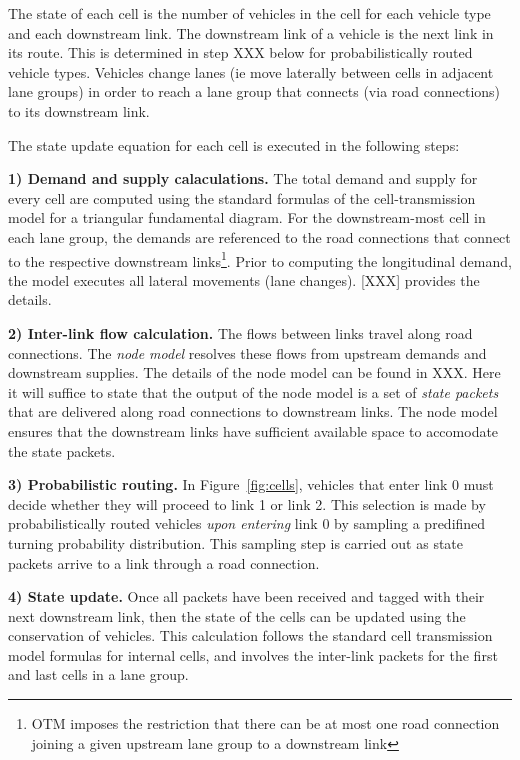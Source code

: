 The state of each cell is the number of vehicles in the cell for each vehicle type and each downstream link. The downstream link of a vehicle is the next link in its route. This is determined in step XXX below for probabilistically routed vehicle types. Vehicles change lanes (ie move laterally between cells in adjacent lane groups) in order to reach a lane group that connects (via road connections) to its downstream link. 

The state update equation for each cell is executed in the following steps:

\vspace{1em} \noindent \textbf{1) Demand and supply calaculations.} The total demand and supply for every cell are computed using the standard formulas of the cell-transmission model for a triangular fundamental diagram. For the downstream-most cell in each lane group, the demands are referenced to the road connections that connect to the respective downstream links\footnote{OTM imposes the restriction that there can be at most one road connection joining a given upstream lane group to a downstream link}. Prior to computing the longitudinal demand, the model executes all lateral movements (lane changes). [XXX] provides the details. 

\vspace{1em}\noindent \textbf{2) Inter-link flow calculation.} The flows between links travel along road connections. The \textit{node model} resolves these flows from upstream demands and downstream supplies. The details of the node model can be found in XXX. Here it will suffice to state that the output of the node model is a set of \textit{state packets} that are delivered along road connections to downstream links. The node model ensures that the downstream links have sufficient available space to accomodate the state packets.  

\vspace{1em}\noindent \textbf{3) Probabilistic routing.} 
In Figure~\ref{fig:cells}, vehicles that enter link 0 must decide whether they will proceed to link 1 or link 2. This selection is made by probabilistically routed vehicles \textit{upon entering} link 0 by sampling a predifined turning probability distribution. This sampling step is carried out as state packets arrive to a link through a road connection. 

\vspace{1em} \noindent \textbf{4) State update.} Once all packets have been received and tagged with their next downstream link, then the state of the cells can be updated using the conservation of vehicles. This calculation follows the standard cell transmission model formulas for internal cells, and involves the inter-link packets for the first and last cells in a lane group. 

